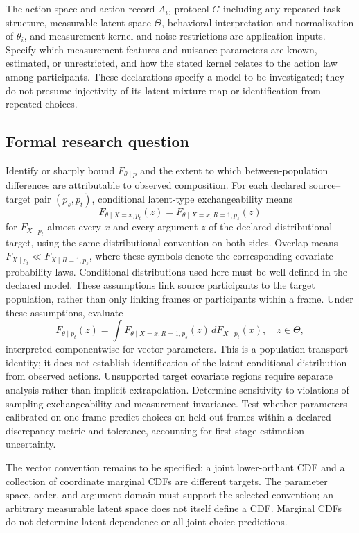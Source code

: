 \documentclass[11pt,a4paper]{article}
\begin{document}
The action space and action record $A_i$, protocol $G$ including any repeated-task structure, measurable latent space $\Theta$, behavioral interpretation and normalization of $\theta_i$, and measurement kernel and noise restrictions are application inputs. Specify which measurement features and nuisance parameters are known, estimated, or unrestricted, and how the stated kernel relates to the action law among participants. These declarations specify a model to be investigated; they do not presume injectivity of its latent mixture map or identification from repeated choices.

\subsection*{Formal research question}

Identify or sharply bound $F_{\theta\mid p}$ and the extent to which between-population differences are attributable to observed composition. For each declared source--target pair $(p_s,p_t)$, conditional latent-type exchangeability means
\[
F_{\theta\mid X=x,p_t}(z)=F_{\theta\mid X=x,R=1,p_s}(z)
\]
for $F_{X\mid p_t}$-almost every $x$ and every argument $z$ of the declared distributional target, using the same distributional convention on both sides. Overlap means $F_{X\mid p_t}\ll F_{X\mid R=1,p_s}$, where these symbols denote the corresponding covariate probability laws. Conditional distributions used here must be well defined in the declared model. These assumptions link source participants to the target population, rather than only linking frames or participants within a frame. Under these assumptions, evaluate
\[
F_{\theta\mid p_t}(z)=\int F_{\theta\mid X=x,R=1,p_s}(z)\,dF_{X\mid p_t}(x),\quad z\in\Theta,
\]
interpreted componentwise for vector parameters. This is a population transport identity; it does not establish identification of the latent conditional distribution from observed actions. Unsupported target covariate regions require separate analysis rather than implicit extrapolation. Determine sensitivity to violations of sampling exchangeability and measurement invariance. Test whether parameters calibrated on one frame predict choices on held-out frames within a declared discrepancy metric and tolerance, accounting for first-stage estimation uncertainty.

The vector convention remains to be specified: a joint lower-orthant CDF and a collection of coordinate marginal CDFs are different targets. The parameter space, order, and argument domain must support the selected convention; an arbitrary measurable latent space does not itself define a CDF. Marginal CDFs do not determine latent dependence or all joint-choice predictions.
\end{document}
